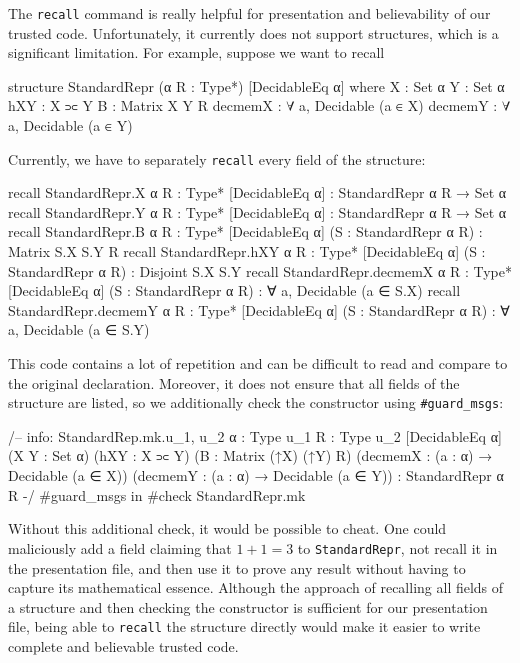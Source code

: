 The \texttt{recall} command is really helpful for presentation and believability of our trusted code. Unfortunately, it currently does not support structures, which is a significant limitation. For example, suppose we want to recall
\begin{leancode}
structure StandardRepr (α R : Type*)
    [DecidableEq α] where
  X : Set α
  Y : Set α
  hXY : X ⫗ Y
  B : Matrix X Y R
  decmemX : ∀ a, Decidable (a ∈ X)
  decmemY : ∀ a, Decidable (a ∈ Y)
\end{leancode}
Currently, we have to separately \texttt{recall} every field of the structure:
\begin{leancode}
recall StandardRepr.X {α R : Type*}
  [DecidableEq α] :
  StandardRepr α R → Set α
recall StandardRepr.Y {α R : Type*}
  [DecidableEq α] :
  StandardRepr α R → Set α
recall StandardRepr.B {α R : Type*}
  [DecidableEq α] (S : StandardRepr α R) :
  Matrix S.X S.Y R
recall StandardRepr.hXY {α R : Type*}
  [DecidableEq α] (S : StandardRepr α R) :
  Disjoint S.X S.Y
recall StandardRepr.decmemX {α R : Type*}
  [DecidableEq α] (S : StandardRepr α R) :
  ∀ a, Decidable (a ∈ S.X)
recall StandardRepr.decmemY {α R : Type*}
  [DecidableEq α] (S : StandardRepr α R) :
  ∀ a, Decidable (a ∈ S.Y)
\end{leancode}
This code contains a lot of repetition and can be difficult to read and compare to the original declaration. Moreover, it does not ensure that all fields of the structure are listed, so we additionally check the constructor using \texttt{\#guard\_msgs}:
\begin{leancode}
/--
info: StandardRep.mk.{u_1, u_2}
  {α : Type u_1} {R : Type u_2} [DecidableEq α]
  (X Y : Set α) (hXY : X ⫗ Y)
  (B : Matrix (↑X) (↑Y) R)
  (decmemX : (a : α) → Decidable (a ∈ X))
  (decmemY : (a : α) → Decidable (a ∈ Y)) :
  StandardRepr α R
-/
#guard_msgs in
#check StandardRepr.mk
\end{leancode}
Without this additional check, it would be possible to cheat. One could maliciously add a field claiming that $1 + 1 = 3$ to \texttt{StandardRepr}, not recall it in the presentation file, and then use it to prove any result without having to capture its mathematical essence. Although the approach of recalling all fields of a structure and then checking the constructor is sufficient for our presentation file, being able to \texttt{recall} the structure directly would make it easier to write complete and believable trusted code.

